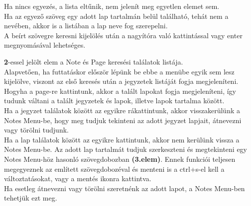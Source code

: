 \vspace{5pt} \noindent Ha nincs egyezés, a lista eltűnik, nem jelenít meg egyetlen elemet sem.
\vspace{5pt} \\Ha az egyező szöveg egy adott lap tartalmán belül található, tehát nem a nevében, akkor is a listában a lap neve fog szerepelni.
\vspace{5pt} \\A beírt szövegre keresni kijelölés után a nagyítóra való kattintással vagy enter megnyomásával lehetséges.
	
	
\vspace{10pt} \noindent \textbf{2}-essel jelölt elem a Note és Page keresési találatok listája.
\vspace{5pt} \\Alapvetően, ha futtatáskor először lépünk be ebbe a menübe egyik sem lesz kijelölve, viszont az első keresés után a jegyzetek listáját fogja megjeleníteni. Hogyha a page-re kattintunk, akkor a talált lapokat fogja megjeleníteni, így tudunk váltani a talált jegyzetek és lapok, illetve lapok tartalma között.
\vspace{5pt} \\Ha a jegyzet találatok között az egyikre rákattintunk, akkor visszakerülünk a Notes Menu-be, hogy meg tudjuk tekinteni az adott jegyzet lapjait, átnevezni vagy törölni tudjunk.
\vspace{5pt} \\Ha a lap találatok között az egyikre kattintunk, akkor nem kerülünk vissza a Notes Menu-be. Az adott lap tartalmát tudjuk szerkeszteni és megtekinteni egy Notes Menu-höz hasonló szövegdobozban \textbf{(3.elem)}. Ennek funkciói teljesen megegyeznek az említett szövegdobozéval és menteni is a ctrl+s-el kell a változtatásokat, vagy a mentés ikonra kattintva.
\vspace{5pt} \\Ha esetleg átnevezni vagy törölni szeretnénk az adott lapot, a Notes Menu-ben tehetjük ezt meg.


